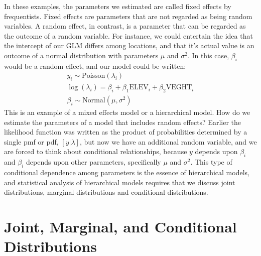 In these examples, the parameters we estimated are called fixed
effects by frequentists. Fixed effects are parameters that are not
regarded as being random variables.
A random effect, in
contrast, is a parameter that can be regarded as the outcome of
a random variable. For instance,
we could entertain the idea that the intercept of our GLM differs
among locations, and that it's actual value is an outcome of a normal
distribution with parameters $\mu$ and $\sigma^2$. In this case,
$\beta_i$ would be a random effect, and our model could be written:
\begin{gather*}
y_i \sim \text{Poisson}(\lambda_i) \\
\log(\lambda_i) = \beta_i + \beta_1\text{ELEV}_i + \beta_2\text{VEGHT}_i \\
\beta_i \sim \text{Normal}(\mu, \sigma^2)
\end{gather*}
This is an example of a mixed effects model or a hierarchical
model. How do we estimate the parameters of a model that includes
random effects? Earlier the likelihood function was written as the
product of probabilities determined by a single pmf or pdf,
$[y|\lambda]$, but now we have an additional random variable, and we
are forced to think about conditional relationships, because $y$
depends upon $\beta_i$ and $\beta_i$ depends upon other parameters,
specifically $\mu$ and $\sigma^2$.
This type of conditional dependence among parameters is the essence of hierarchical
models, and statistical analysis of hierarchical models requires that
we discuss joint distributions, marginal distributions and conditional
distributions.




\section{Joint, Marginal, and Conditional Distributions}

